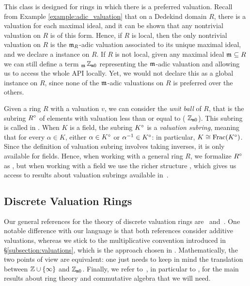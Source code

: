 \documentclass[sigplan,10pt, nonacm, review]{acmart}
\begin{document}
This class is designed for rings in which there is a preferred valuation. Recall from Example \ref{example:adic_valuation} that 
on a Dedekind domain $R$, there is a valuation for each maximal ideal, and it can be shown that any nontrivial valuation on $R$ is of this form. Hence, if $R$ is local, then the only nontrivial valuation on $R$ is the  $\mathfrak{m}_{R}$-adic valuation associated to its unique maximal ideal, and we declare a  instance on $R$. If $R$ is not local, given any maximal ideal $\maxid[\empty]\subseteq R$  we can still define a term $_{\maxid[\empty]}$\;$\mathbb{Z}_{\mathtt{m}0}$\code{)} representing the $\maxid[\empty]$-adic valuation and allowing us to access the whole  API locally. Yet, we would not declare this as a global  instance on $R$, since none of the $\maxid[\empty]$-adic valuations on $R$ is preferred over the others.

Given a ring $R$ with a valuation $v$, we can consider the \textit{unit ball} of $R$, that is the subring ${R}^\circ$ of elements with valuation less than or equal to ( $\mathbb{Z}_{\mathtt{m}0}$). This subring is called \href{https://leanprover-community.github.io/mathlib_docs/ring_theory/valuation/integers.html#valuation.integer}{\extlink} in \mathlib. 
When $K$ is a field, the subring ${K}^\circ$ is a \emph{valuation subring}, meaning that for every $\alpha\in K$, either $\alpha \in {K}^\circ$ or $\alpha^{-1} \in {K}^\circ$: in particular, $K\cong\operatorname{Frac}({K}^\circ)$. Since the definition of valuation subring involves taking inverses, it is only available for fields. Hence, when working with a general ring $R$, we formalize ${R}^\circ$ as , but when working with a field we use the richer structure \href{https://leanprover-community.github.io/mathlib_docs/ring_theory/valuation/valuation_subring.html#valuation_subring}{\extlink}, which gives us access to results about valuation subrings available in~\mathlib. 

\subsection{Discrete Valuation Rings}\label{subsection:def_dvr}

Our general references for the theory of discrete valuation rings are~\cite[Chapitres~I--II]{Ser62} and~\cite[Chapitre~VI]{Bou85}. One notable difference with our language is that both references consider additive valuations, whereas we stick to the multiplicative convention introduced in \S\ref{subsection:valuations}, which is the approach chosen in \mathlib. 
Mathematically, the two points of view are equivalent: one just needs to keep in mind the translation between $\mathbb{Z} \cup \{\infty\}$ and $\mathbb{Z}_{\mathtt{m}0}$. Finally, we refer to~\cite{Bou07}, in particular to \cite[Chapitre~IV]{Bou07}, for the main results about ring theory and commutative algebra that we will need.
\end{document}
